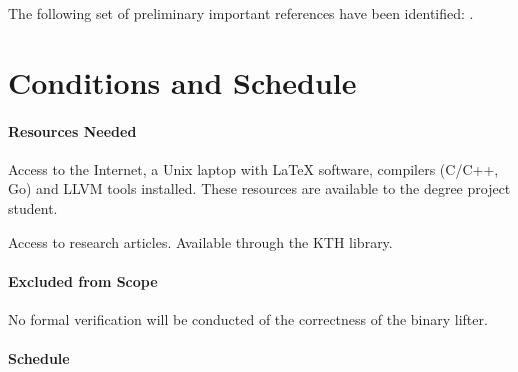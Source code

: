 \documentclass[12pt, a4paper]{article}
\begin{document}
The following set of preliminary important references have been identified: \cite{graph_based_ir,retargetable_binary_translator,dynamic_binary_translation,uqbt_binary_translator,retargetable_static_binary_translator,ssa_for_decompilation,valgrind,bitblaze,architecture_independent_binary_analysis_and_transformation,arm_analysis_using_llvm,bap,revgen,wartell_rewriting_x86_binaries,barf,singled_graph_disassembly,dbill,instruction_idiom_detection,graph_based_higher_order_ir,reconstruction_of_instruction_idioms,extracting_instruction_semantics_via_symbolic_exectuion_of_code_generators,software_transformation,state_of_the_art_of_war,function_recovery,bin2llvm,sound_transpilation_from_binary_to_ir,cast_study_llvm_suitable_for_binary_analysis,revng,evaluation_of_irs,binrec,lifter_synthesis,superset_disassembly,b2r2,llvm_ir_lifter_using_mcsema_and_dyninst,gtirb,case_for_bap_and_angr,retrowrite,refining_indirect_call_targets}.


\section{Conditions and Schedule}


\paragraph{Resources Needed}

Access to the Internet, a Unix laptop with LaTeX software, compilers (C/C++, Go) and LLVM tools installed. These resources are available to the degree project student.

Access to research articles. Available through the KTH library.


\paragraph{Excluded from Scope}

No formal verification will be conducted of the correctness of the binary lifter.


\paragraph{Schedule}
\end{document}
